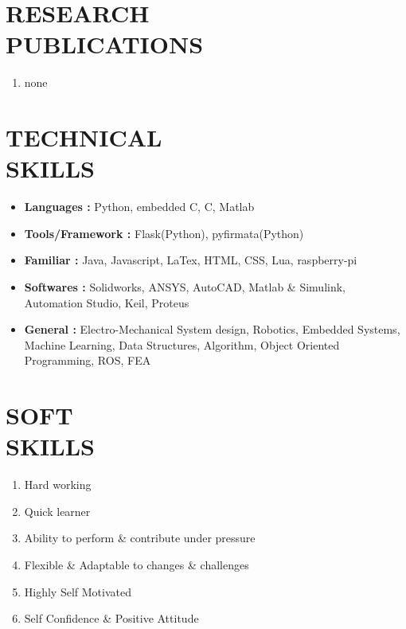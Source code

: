 \documentclass[margin]{res}
\begin{document}
    \section{RESEARCH \\ PUBLICATIONS}
    \begin{enumerate}
        \item none
    \end{enumerate}
  
    \section{TECHNICAL \\ SKILLS}
    \begin{itemize}
    \item \textbf{Languages : } Python, embedded C, C, Matlab 
    \item \textbf{Tools/Framework : } Flask(Python), pyfirmata(Python)
    \item \textbf{Familiar : } Java, Javascript, LaTex, HTML, CSS, Lua, raspberry-pi  
    \item \textbf{Softwares :} Solidworks, ANSYS, AutoCAD, Matlab \& Simulink, Automation Studio, Keil, Proteus   
    \item \textbf{General : } Electro-Mechanical System design, Robotics, Embedded Systems, Machine Learning, 
                            Data Structures, Algorithm, Object Oriented Programming, ROS, FEA \\
    \end{itemize}
  
    \section{SOFT \\ SKILLS}
    \begin{enumerate}   
    \item {Hard working }
    \item {Quick learner }
    \item {Ability to perform \& contribute under pressure}
    \item {Flexible \& Adaptable to changes \& challenges}
    \item {Highly Self Motivated}
    \item {Self Confidence \& Positive Attitude}
    \end{enumerate}
  
\end{document}
